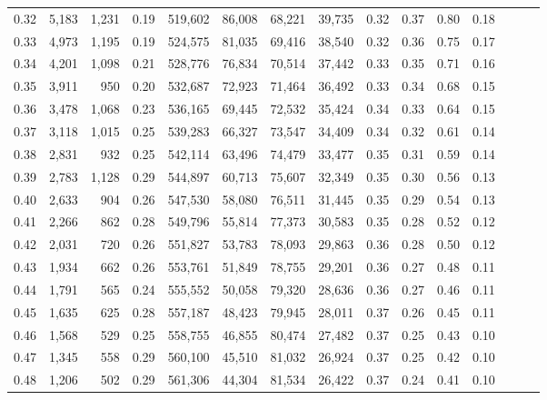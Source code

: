 \begin{tabular}{rrrrrrrrrrrrrrr}
0.32 &   5,183 &  1,231 &  0.19 &  519,602 &   86,008 &   68,221 &   39,735 &  0.32 &  0.37 &  0.80 &      0.18 \\
0.33 &   4,973 &  1,195 &  0.19 &  524,575 &   81,035 &   69,416 &   38,540 &  0.32 &  0.36 &  0.75 &      0.17 \\
0.34 &   4,201 &  1,098 &  0.21 &  528,776 &   76,834 &   70,514 &   37,442 &  0.33 &  0.35 &  0.71 &      0.16 \\
0.35 &   3,911 &    950 &  0.20 &  532,687 &   72,923 &   71,464 &   36,492 &  0.33 &  0.34 &  0.68 &      0.15 \\
0.36 &   3,478 &  1,068 &  0.23 &  536,165 &   69,445 &   72,532 &   35,424 &  0.34 &  0.33 &  0.64 &      0.15 \\
0.37 &   3,118 &  1,015 &  0.25 &  539,283 &   66,327 &   73,547 &   34,409 &  0.34 &  0.32 &  0.61 &      0.14 \\
0.38 &   2,831 &    932 &  0.25 &  542,114 &   63,496 &   74,479 &   33,477 &  0.35 &  0.31 &  0.59 &      0.14 \\
0.39 &   2,783 &  1,128 &  0.29 &  544,897 &   60,713 &   75,607 &   32,349 &  0.35 &  0.30 &  0.56 &      0.13 \\
0.40 &   2,633 &    904 &  0.26 &  547,530 &   58,080 &   76,511 &   31,445 &  0.35 &  0.29 &  0.54 &      0.13 \\
0.41 &   2,266 &    862 &  0.28 &  549,796 &   55,814 &   77,373 &   30,583 &  0.35 &  0.28 &  0.52 &      0.12 \\
0.42 &   2,031 &    720 &  0.26 &  551,827 &   53,783 &   78,093 &   29,863 &  0.36 &  0.28 &  0.50 &      0.12 \\
0.43 &   1,934 &    662 &  0.26 &  553,761 &   51,849 &   78,755 &   29,201 &  0.36 &  0.27 &  0.48 &      0.11 \\
0.44 &   1,791 &    565 &  0.24 &  555,552 &   50,058 &   79,320 &   28,636 &  0.36 &  0.27 &  0.46 &      0.11 \\
0.45 &   1,635 &    625 &  0.28 &  557,187 &   48,423 &   79,945 &   28,011 &  0.37 &  0.26 &  0.45 &      0.11 \\
0.46 &   1,568 &    529 &  0.25 &  558,755 &   46,855 &   80,474 &   27,482 &  0.37 &  0.25 &  0.43 &      0.10 \\
0.47 &   1,345 &    558 &  0.29 &  560,100 &   45,510 &   81,032 &   26,924 &  0.37 &  0.25 &  0.42 &      0.10 \\
0.48 &   1,206 &    502 &  0.29 &  561,306 &   44,304 &   81,534 &   26,422 &  0.37 &  0.24 &  0.41 &      0.10 \\

\end{tabular}
